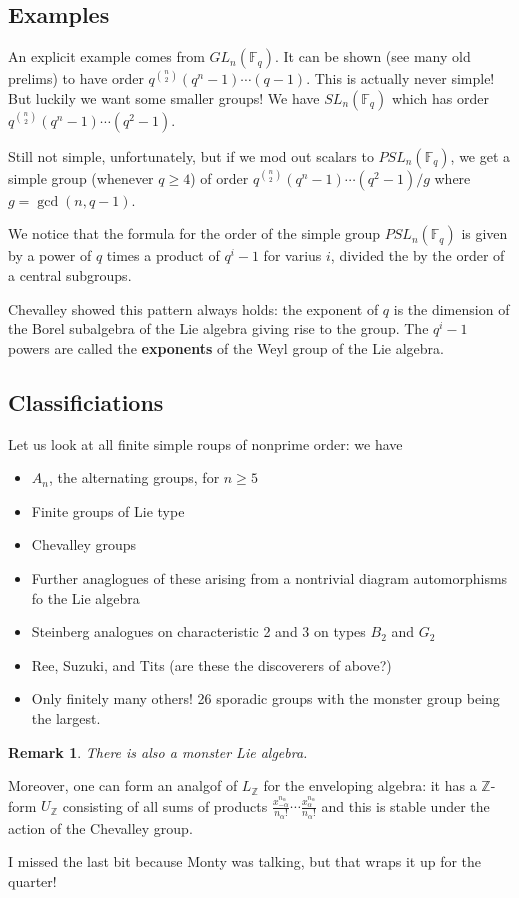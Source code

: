 \documentclass[12pt]{article}
\theoremstyle{nonumberbreak}
\theoremstyle{changebreak}
\theoremstyle{nonumberbreak}
\theoremstyle{change}
\newtheorem{rmk}[thm]{Remark}
\newcommand*{\Z}{
\mathbb{Z}
}
\begin{document}
\subsection{Examples}
An explicit example comes from $GL_n(\mathbb{F}_q)$. It can be shown (see many old prelims) to 
have order $q^{\binom{n}{2}}(q^n-1)\cdots(q-1)$. This is actually never simple! But luckily we want some smaller
groups! We have $SL_n(\mathbb{F}_q)$ which has order $q^{\binom{n}{2}}(q^n-1)\cdots(q^2-1)$.

Still not simple, unfortunately, but if we mod out scalars to $PSL_n(\mathbb{F}_q)$, we get a simple
group (whenever $q\ge 4$) of order $q^{\binom{n}{2}}(q^n-1)\cdots(q^2-1)/g$ where $g=\operatorname{gcd}(n,q-1)$.

We notice that the formula for the order of the simple group $PSL_n(\mathbb{F}_q)$ is given 
by a power of $q$ times a product of $q^i-1$ for varius $i$, divided the by the order of a central
subgroups.

Chevalley showed this pattern always holds: the exponent of $q$ is the dimension of the Borel
subalgebra of the Lie algebra giving rise to the group. The $q^i-1$ powers are called the \textbf{exponents}
of the Weyl group of the Lie algebra.

\subsection{Classificiations}
Let us look at all finite simple roups of nonprime order: we have
\begin{itemize}
	\item $A_n$, the alternating groups, for $n\ge 5$
	\item Finite groups of Lie type 
	\item Chevalley groups
	\item Further anaglogues of these arising from a nontrivial diagram automorphisms fo the Lie algebra
	\item Steinberg analogues on characteristic 2 and 3 on types $B_2$ and $G_2$
	\item Ree, Suzuki, and Tits (are these the discoverers of above?)
	\item Only finitely many others! 26 sporadic groups with the monster group being the largest.
\end{itemize}
\begin{rmk}
	There is also a monster Lie algebra.
\end{rmk}

Moreover, one can form an analgof of $L_\Z$ for the enveloping algebra: it has a $\Z$-form
$U_\Z$ consisting of all sums of products $\frac{x^{n_\alpha}_{-\alpha}}{n_\alpha!}\cdots\frac{x_\alpha^{n_\alpha}}{n_\alpha!}$
and this is stable under the action of the Chevalley group.

I missed the last bit because Monty was talking, but that wraps it up for the quarter!
\end{document}
